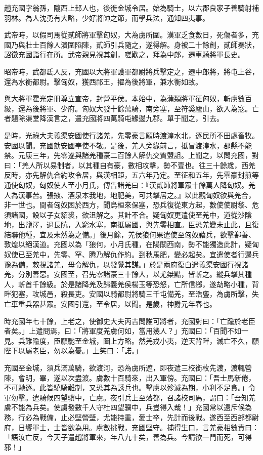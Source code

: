 
\begin{pinyinscope}
趙充國字翁孫，隴西上邽人也，後徙金城令居。始為騎士，以六郡良家子善騎射補羽林。為人沈勇有大略，少好將帥之節，而學兵法，通知四夷事。

武帝時，以假司馬從貳師將軍擊匈奴，大為虜所圍。漢軍乏食數日，死傷者多，充國乃與壯士百餘人潰圍陷陳，貳師引兵隨之，遂得解。身被二十餘創，貳師奏狀，詔徵充國詣行在所。武帝親見視其創，嗟歎之，拜為中郎，遷車騎將軍長史。

昭帝時，武都氐人反，充國以大將軍護軍都尉將兵擊定之，遷中郎將，將屯上谷，還為水衡都尉。擊匈奴，獲西祁王，擢為後將軍，兼水衡如故。

與大將軍霍光定冊尊立宣帝，封營平侯。本始中，為蒲類將軍征匈奴，斬虜數百級，還為後將軍、少府。匈奴大發十餘萬騎，南旁塞，至符奚廬山，欲入為寇。亡者題除渠堂降漢言之，遣充國將四萬騎屯緣邊九郡。單于聞之，引去。

是時，光祿大夫義渠安國使行諸羌，先零豪言願時渡湟水北，逐民所不田處畜牧。安國以聞。充國劾安國奉使不敬。是後，羌人旁緣前言，抵冒渡湟水，郡縣不能禁。元康三年，先零遂與諸羌種豪二百餘人解仇交質盟詛。上聞之，以問充國，對曰：「羌人所以易制者，以其種自有豪，數相攻擊，勢不壹也。往三十餘歲，西羌反時，亦先解仇合約攻令居，與漢相距，五六年乃定。至征和五年，先零豪封煎等通使匈奴，匈奴使人至小月氏，傳告諸羌曰：『漢貳師將軍眾十餘萬人降匈奴。羌人為漢事苦。張掖、酒泉本我地，地肥美，可共擊居之。』以此觀匈奴欲與羌合，非一世也。間者匈奴困於西方，聞烏桓來保塞，恐兵復從東方起，數使使尉黎、危須諸國，設以子女貂裘，欲沮解之。其計不合。疑匈奴更遣使至羌中，道從沙陰地，出鹽澤，過長阬，入窮水塞，南抵屬國，與先零相直。臣恐羌變未止此，且復結聯他種，宜及未然為之備。」後月餘，羌侯狼何果遣使至匈奴藉兵，欲擊鄯善、敦煌以絕漢道。充國以為「狼何，小月氏種，在陽關西南，勢不能獨造此計，疑匈奴使已至羌中，先零、罕、腾乃解仇作約。到秋馬肥，變必起矣。宜遣使者行邊兵豫為備，敕視諸羌，毋令解仇，以發覺其謀。」於是兩府復白遣義渠安國行視諸羌，分別善惡。安國至，召先零諸豪三十餘人，以尤桀黠，皆斬之。縱兵擊其種人，斬首千餘級。於是諸降羌及歸義羌侯楊玉等恐怒，亡所信鄉，遂劫略小種，背畔犯塞，攻城邑，殺長吏。安國以騎都尉將騎三千屯備羌，至浩亹，為虜所擊，失亡車重兵器甚眾。安國引還，至令居，以聞。是歲，神爵元年春也。

時充國年七十餘，上老之，使御史大夫丙吉問誰可將者，充國對曰：「亡踰於老臣者矣。」上遣問焉，曰：「將軍度羌虜何如，當用幾人？」充國曰：「百聞不如一見。兵難隃度，臣願馳至金城，圖上方略。然羌戎小夷，逆天背畔，滅亡不久，願陛下以屬老臣，勿以為憂。」上笑曰：「諾。」

充國至金城，須兵滿萬騎，欲渡河，恐為虜所遮，即夜遣三校銜枚先渡，渡輒營陳，會明，畢，遂以次盡渡。虜數十百騎來，出入軍傍。充國曰：「吾士馬新倦，不可馳逐。此皆驍騎難制，又恐其為誘兵也。擊虜以殄滅為期，小利不足貪。」令軍勿擊。遣騎候四望骥中，亡虜。夜引兵上至落都，召諸校司馬，謂曰：「吾知羌虜不能為兵矣。使虜發數千人守杜四望骥中，兵豈得入哉！」充國常以遠斥候為務，行必為戰備，止必堅營壁，尤能持重，愛士卒，先計而後戰。遂西至西部都尉府，日饗軍士，士皆欲為用。虜數挑戰，充國堅守。捕得生口，言羌豪相數責曰：「語汝亡反，今天子遣趙將軍來，年八九十矣，善為兵。今請欲一鬥而死，可得邪！」


\end{pinyinscope}

